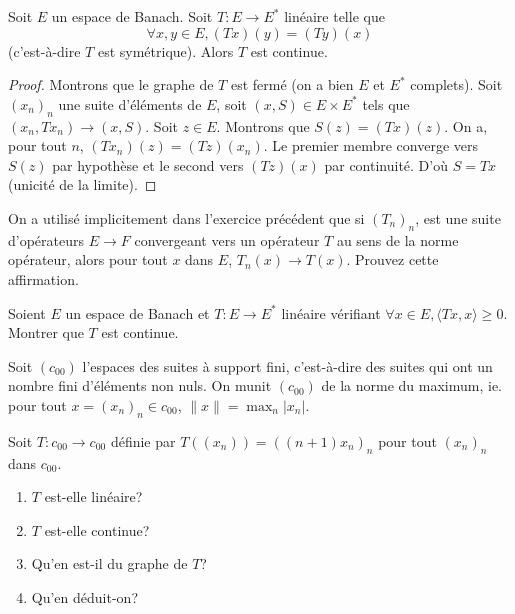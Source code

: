 \begin{prop}
  Soit $E$ un espace de Banach. Soit $T: E\to E^*$ linéaire
  telle que
  $$\forall x, y \in E, (Tx)(y) = (Ty)(x)$$
  (c'est-à-dire $T$ est symétrique). Alors $T$ est continue.
\end{prop}

\begin{proof}
  Montrons que le graphe de $T$ est fermé (on a bien $E$ et $E^*$
  complets). Soit $(x_n)_n$ une suite d'éléments de $E$, soit
  $(x, S)\in E \times E^*$ tels que $(x_n, Tx_n)\to (x, S)$.
  Soit $z\in E$. Montrons que $S(z) = (Tx)(z)$.
  On a, pour tout $n$, $(Tx_n)(z) = (Tz)(x_n)$. Le premier
  membre converge vers $S(z)$ par hypothèse et le second
  vers $(Tz)(x)$ par continuité. D'où $S = Tx$ (unicité
  de la limite).
\end{proof}

\begin{exo}
  On a utilisé implicitement dans l'exercice précédent
  que si $(T_n)_n$, est une suite d'opérateurs $E\to F$ convergeant
  vers un opérateur $T$ au sens de la norme opérateur,
  alors pour tout $x$ dans $E$, $T_n(x) \to T(x)$. Prouvez
  cette affirmation.
\end{exo}

\begin{exo}\label{grp:ferme:exo:pos}
  Soient $E$ un espace de Banach et $T: E\to E^*$ linéaire vérifiant
  $\forall x\in E, \langle Tx, x\rangle\geq 0$. Montrer que $T$
  est continue.
\end{exo}


\begin{exo}
  Soit $(c_{00})$ l'espaces des suites à support fini, c'est-à-dire
  des suites qui ont un nombre fini d'éléments non nuls. On munit
  $(c_{00})$ de la norme du maximum, ie. pour tout $x=(x_n)_n\in c_{00}$,
  $\|x\| = \max_{n}|x_n|$.

  Soit $T:c_{00}\to c_{00}$ définie par $T((x_n)) = ((n+1)x_n)_n$
  pour tout $(x_n)_n$ dans $c_{00}$.
  \begin{enumerate}
  \item $T$ est-elle linéaire?
  \item $T$ est-elle continue?
  \item Qu'en est-il du graphe de $T$?
  \item Qu'en déduit-on?
  \end{enumerate}
\end{exo}

